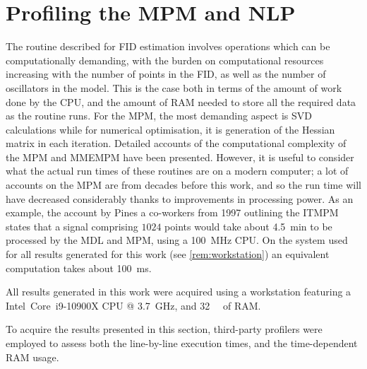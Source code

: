 \section{Profiling the \acs{MPM} and \acs{NLP}}
\label{sec:profiling}
The routine described for \ac{FID} estimation involves operations which can be
computationally demanding, with the burden on computational resources
increasing with the number of points in the \ac{FID}, as well as the number of
oscillators in the model. This is the case both in terms of the amount of work
done by the \ac{CPU}, and the amount of \ac{RAM} needed to store all the
required data as the routine runs. For the \ac{MPM}, the most
demanding aspect is \ac{SVD} calculations while for numerical optimisation, it
is generation of the Hessian matrix in each iteration. Detailed accounts of the
computational complexity of the \ac{MPM} and \ac{MMEMPM} have been
presented\cite{Hua1992,Chen2007}.  However, it is useful to consider what the
actual run times of these routines are on a modern computer; a lot of
accounts on the \ac{MPM} are from decades before this work, and so the
run time will have decreased considerably thanks to
improvements in processing power. As an example, the account by Pines a
co-workers from 1997 outlining the \ac{ITMPM} states that a signal comprising
$1024$ points would take about
\qty{4.5}{\minute} to be processed by the \ac{MDL} and \ac{MPM}, using a
\qty{100}{\mega\hertz} \ac{CPU}\cite{Lin1997}. On the system used for all
results generated for this work (see \cref{rem:workstation}) an
equivalent computation takes about \qty{100}{\milli\second}.
\begin{remark}
    \label{rem:workstation}
    All results generated in this work were acquired using a workstation
    featuring a Intel\textregistered\ Core\texttrademark\ i9-10900X \ac{CPU} @
    \qty{3.7}{\giga\hertz}, and \qty{32}{\gibi\byte} of \ac{RAM}.
\end{remark}

To acquire the results presented in this section, third-party \Python profilers
were employed to assess both the line-by-line execution times\cite{LineProf},
and the time-dependent \ac{RAM} usage\cite{MemProf}.

